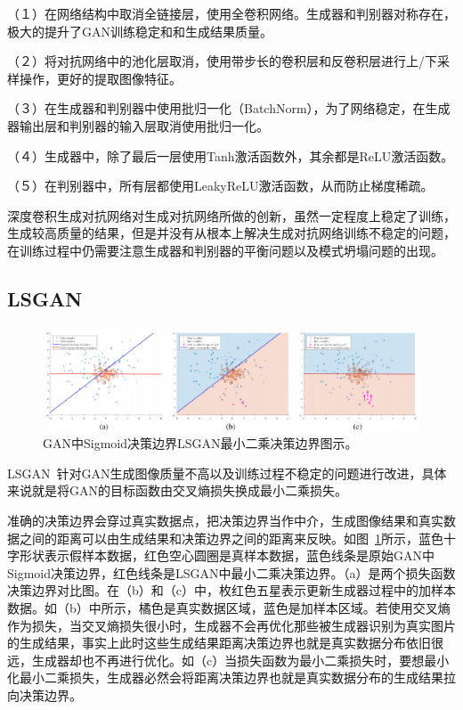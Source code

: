 （１）在网络结构中取消全链接层，使用全卷积网络。生成器和判别器对称存在，极大的提升了GAN训练稳定和和生成结果质量。

（２）将对抗网络中的池化层取消，使用带步长的卷积层和反卷积层进行上/下采样操作，更好的提取图像特征。

（３）在生成器和判别器中使用批归一化（BatchNorm），为了网络稳定，在生成器输出层和判别器的输入层取消使用批归一化。

（４）生成器中，除了最后一层使用Tanh激活函数外，其余都是ReLU激活函数。

（５）在判别器中，所有层都使用LeakyReLU激活函数，从而防止梯度稀疏。

深度卷积生成对抗网络对生成对抗网络所做的创新，虽然一定程度上稳定了训练，生成较高质量的结果，但是并没有从根本上解决生成对抗网络训练不稳定的问题，在训练过程中仍需要注意生成器和判别器的平衡问题以及模式坍塌问题的出现。

\subsection{LSGAN}
\begin{figure}[ht]
    \centering
	\includegraphics[width=\textwidth]{figures/lsgan.pdf}
	\caption{GAN中Sigmoid决策边界LSGAN最小二乘决策边界图示。}
	\label{fig:pic_lsgan}
\end{figure}

LSGAN~\cite{mao2017least}针对GAN生成图像质量不高以及训练过程不稳定的问题进行改进，具体来说就是将GAN的目标函数由交叉熵损失换成最小二乘损失。

准确的决策边界会穿过真实数据点，把决策边界当作中介，生成图像结果和真实数据之间的距离可以由生成结果和决策边界之间的距离来反映。如图~\ref{fig:pic_lsgan}所示，蓝色十字形状表示假样本数据，红色空心圆圈是真样本数据，蓝色线条是原始GAN中Sigmoid决策边界，红色线条是LSGAN中最小二乘决策边界。（a）是两个损失函数决策边界对比图。在（b）和（c）中，枚红色五星表示更新生成器过程中的加样本数据。如（b）中所示，橘色是真实数据区域，蓝色是加样本区域。若使用交叉熵作为损失，当交叉熵损失很小时，生成器不会再优化那些被生成器识别为真实图片的生成结果，事实上此时这些生成结果距离决策边界也就是真实数据分布依旧很远，生成器却也不再进行优化。如（c）当损失函数为最小二乘损失时，要想最小化最小二乘损失，生成器必然会将距离决策边界也就是真实数据分布的生成结果拉向决策边界。


